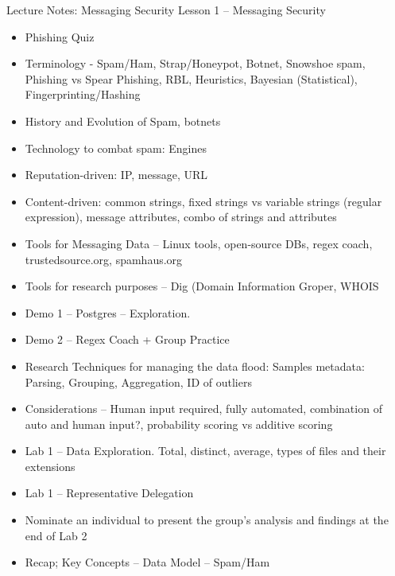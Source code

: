 \documentclass[12pt]{article}
\begin{document}
\newpage
Lecture Notes: Messaging Security 
\newline
Lesson 1 – Messaging Security
\begin{itemize}
\item Phishing Quiz
\item Terminology - Spam/Ham, Strap/Honeypot, Botnet, Snowshoe spam, Phishing vs Spear Phishing, RBL, Heuristics, Bayesian (Statistical), Fingerprinting/Hashing
\item History and Evolution of Spam, botnets
\item Technology to combat spam: Engines
\item Reputation-driven: IP, message, URL
\item Content-driven: common strings, fixed strings vs variable strings (regular expression), message attributes, combo of strings and attributes
\item Tools for Messaging Data – Linux tools, open-source DBs, regex coach, trustedsource.org, spamhaus.org
\item Tools for research purposes – Dig (Domain Information Groper, WHOIS
\item Demo 1 – Postgres – Exploration.
\item Demo 2 – Regex Coach + Group Practice
\item Research Techniques for managing the data flood: Samples metadata: Parsing, Grouping, Aggregation, ID of outliers
\item Considerations – Human input required, fully automated, combination of auto and human input?, probability scoring vs additive scoring
\item Lab 1 – Data Exploration. Total, distinct, average, types of files and their extensions
\item Lab 1 – Representative Delegation
\item Nominate an individual to present the group’s analysis and findings at the end of Lab 2
\item Recap; Key Concepts – Data Model – Spam/Ham


\end{itemize}
\end{document}
